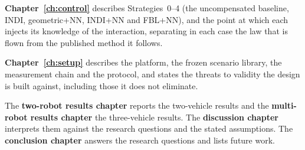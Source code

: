 \textbf{Chapter~\ref{ch:control}} describes Strategies~0--4 (the uncompensated baseline, INDI,
geometric+NN, INDI+NN and FBL+NN), and the point at which each injects its knowledge of the
interaction, separating in each case the law that is flown from the published method it follows.

\textbf{Chapter~\ref{ch:setup}} describes the platform, the frozen scenario library, the
measurement chain and the protocol, and states the threats to validity the design is built against, including those it does not eliminate.

The \textbf{two-robot results chapter} reports the two-vehicle results and the \textbf{multi-robot
results chapter} the three-vehicle results. The \textbf{discussion chapter} interprets them against
the research questions and the stated assumptions. The \textbf{conclusion chapter} answers the
research questions and lists future work.

